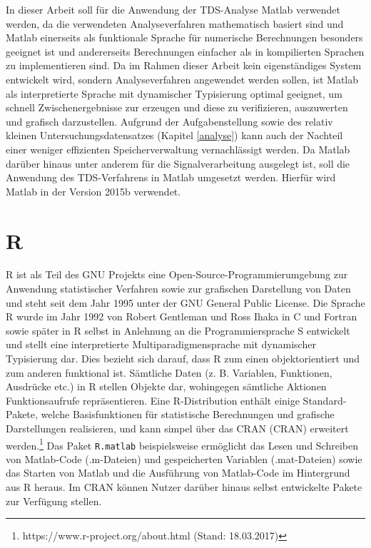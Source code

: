 In dieser Arbeit soll für die Anwendung der \acs{TDS}-Analyse Matlab verwendet werden, da die verwendeten Analyseverfahren mathematisch basiert sind und Matlab einerseits als funktionale Sprache für numerische Berechnungen besonders geeignet ist und andererseits Berechnungen einfacher als in kompilierten Sprachen zu implementieren sind. Da im Rahmen dieser Arbeit kein eigenständiges System entwickelt wird, sondern Analyseverfahren angewendet werden sollen, ist Matlab als interpretierte Sprache mit dynamischer Typisierung optimal geeignet, um schnell Zwischenergebnisse zur erzeugen und diese zu verifizieren, auszuwerten und grafisch darzustellen. Aufgrund der Aufgabenstellung sowie des relativ kleinen Untersuchungsdatensatzes (Kapitel \ref{analyse}) kann auch der Nachteil einer weniger effizienten Speicherverwaltung vernachlässigt werden. Da Matlab darüber hinaus unter anderem für die Signalverarbeitung ausgelegt ist, soll die Anwendung des \acs{TDS}-Verfahrens in Matlab umgesetzt werden. Hierfür wird  Matlab in der Version 2015b verwendet.

%


\section{R}

R ist als Teil des GNU Projekts eine Open-Source-Programmierumgebung zur Anwendung statistischer Verfahren sowie zur grafischen Darstellung von Daten und steht seit dem Jahr 1995 unter der GNU General Public License. Die Sprache R wurde im Jahr 1992 von Robert Gentleman und Ross Ihaka in C und Fortran sowie später in R selbst in Anlehnung an die Programmiersprache S entwickelt und stellt eine interpretierte Multiparadigmensprache mit dynamischer Typisierung dar. Dies bezieht sich darauf, dass R zum einen objektorientiert und zum anderen funktional ist. Sämtliche Daten (z. B. Variablen, Funktionen, Ausdrücke etc.) in R stellen Objekte dar, wohingegen sämtliche Aktionen Funktionsaufrufe repräsentieren. Eine R-Distribution enthält einige Standard-Pakete, welche Basisfunktionen für statistische Berechnungen und grafische Darstellungen realisieren, und kann simpel über das \acl{CRAN} (\acs{CRAN}) erweitert werden.\footnote{https://www.r-project.org/about.html (Stand: 18.03.2017)} Das Paket \texttt{R.matlab} beispielsweise ermöglicht das Lesen und Schreiben von Matlab-Code (.m-Dateien) und gespeicherten Variablen (.mat-Dateien) sowie das Starten von Matlab und die Ausführung von Matlab-Code im Hintergrund aus R heraus. Im \acs{CRAN} können Nutzer darüber hinaus selbst entwickelte Pakete zur Verfügung stellen. \parencite{adler_r_2012, manderscheid_sozialwissenschaftliche_2012}\\

